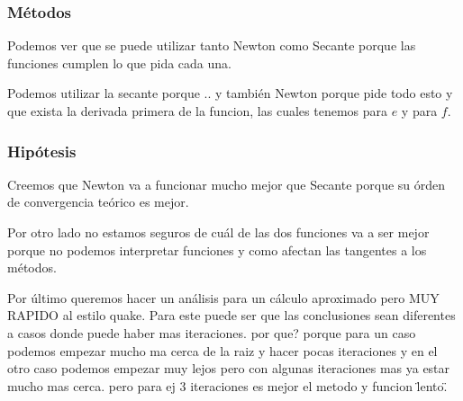 \subsubsection{Métodos}
Podemos ver que se puede utilizar tanto Newton como Secante porque las
funciones cumplen lo que pida cada una.

Podemos utilizar la secante porque .. y también Newton porque pide todo esto y
que exista la derivada primera de la funcion, las cuales tenemos para $e$ y para
$f$.

\subsubsection{Hipótesis}
Creemos que Newton va a funcionar mucho mejor que Secante porque su órden de
convergencia teórico es mejor.

Por otro lado no estamos seguros de cuál de las dos funciones va a ser mejor
porque no podemos interpretar funciones y como afectan las tangentes a los
métodos.

Por último queremos hacer un análisis para un cálculo aproximado pero MUY
RAPIDO al estilo quake. Para este puede ser que las conclusiones sean
diferentes a casos donde puede haber mas iteraciones.  por que? porque para un
caso podemos empezar mucho ma cerca de la raiz y hacer pocas iteraciones y en
el otro caso podemos empezar muy lejos pero con algunas iteraciones mas ya
estar mucho mas cerca. pero para ej 3 iteraciones es mejor el metodo y funcion
\"lento\".


